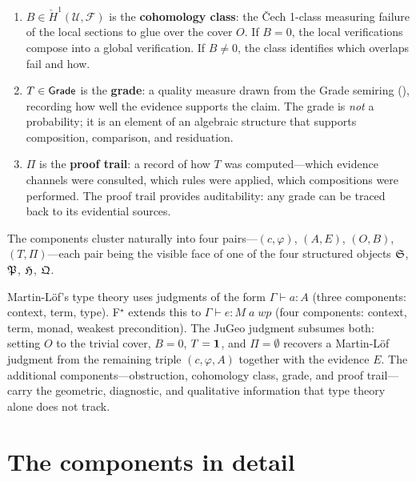 \begin{definition}[Judgment]
\begin{enumerate}[label=(\roman*),itemsep=4pt]
\item $B \in \check{H}^1(\mathcal{U}, \mathcal{F})$ is the
  \textbf{cohomology class}: the \v{C}ech 1-class measuring failure
  of the local sections to glue over the cover $O$.  If
  $B = 0$, the local verifications compose into a global
  verification.  If $B \neq 0$, the class identifies which overlaps
  fail and how.

\item $T \in \mathsf{Grade}$ is the \textbf{grade}: a quality measure drawn
  from the Grade semiring (), recording how well the
  evidence supports the claim.  The grade is \emph{not} a probability;
  it is an element of an algebraic structure that supports
  composition, comparison, and residuation.

\item $\Pi$ is the \textbf{proof trail}: a record of how $T$ was
  computed---which evidence channels were consulted, which rules were
  applied, which compositions were performed.  The proof trail
  provides auditability: any grade can be traced back to its
  evidential sources.
\end{enumerate}

\noindent The components cluster naturally into four pairs---$(c,
\varphi)$, $(A, E)$, $(O, B)$, $(T, \Pi)$---each pair being the
visible face of one of the four structured objects $\mathfrak{S}$, $\mathfrak{P}$,
$\mathfrak{H}$, $\mathfrak{Q}$.
\end{definition}

\begin{remark}
\label{rem:mlof}
Martin-L\"of's type theory uses judgments of the form
$\Gamma \vdash a : A$ (three components: context, term, type).
F$^\star$ extends this to $\Gamma \vdash e : M\;a\;\mathit{wp}$ (four
components: context, term, monad, weakest precondition).  The JuGeo
judgment subsumes both: setting $O$ to the trivial cover, $B = 0$,
$T = \mathbf{1}$, and $\Pi = \emptyset$ recovers a Martin-L\"of judgment
from the remaining triple $(c, \varphi, A)$ together with the
evidence $E$.  The additional components---obstruction, cohomology
class, grade, and proof trail---carry the geometric, diagnostic, and
qualitative information that type theory alone does not track.
\end{remark}


\section{The components in detail}
\label{sec:judgment:components}

